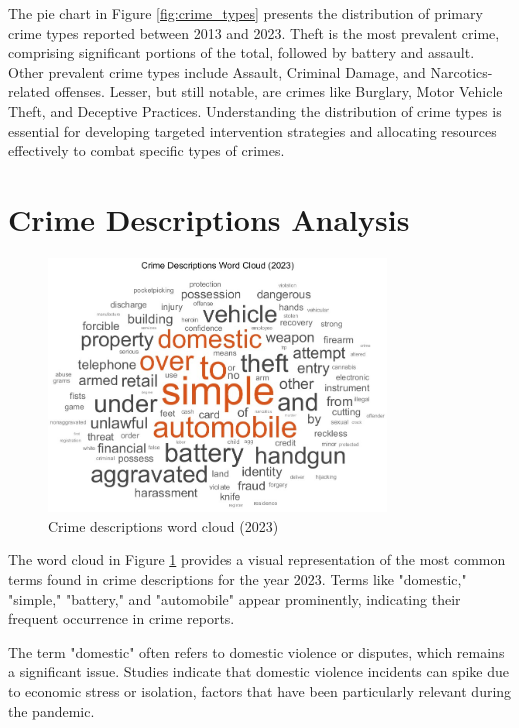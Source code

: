 \documentclass{article}
\begin{document}
The pie chart in Figure \ref{fig:crime_types} presents the distribution of primary crime types reported between 2013 and 2023. Theft is the most prevalent crime, comprising significant portions of the total, followed by battery and assault. Other prevalent crime types include Assault, Criminal Damage, and Narcotics-related offenses. Lesser, but still notable, are crimes like Burglary, Motor Vehicle Theft, and Deceptive Practices. Understanding the distribution of crime types is essential for developing targeted intervention strategies and allocating resources effectively to combat specific types of crimes.

\FloatBarrier
\section{Crime Descriptions Analysis}

\begin{figure}[h!]
    \centering
    \includegraphics[width=0.8\textwidth]{Crime_description_wordcloud.jpg}
    \caption{Crime descriptions word cloud (2023)}
    \label{fig:crime_wordcloud}
\end{figure}

The word cloud in Figure \ref{fig:crime_wordcloud} provides a visual representation of the most common terms found in crime descriptions for the year 2023. Terms like "domestic," "simple," "battery," and "automobile" appear prominently, indicating their frequent occurrence in crime reports. 

The term "domestic" often refers to domestic violence or disputes, which remains a significant issue. Studies indicate that domestic violence incidents can spike due to economic stress or isolation, factors that have been particularly relevant during the pandemic.
\end{document}
